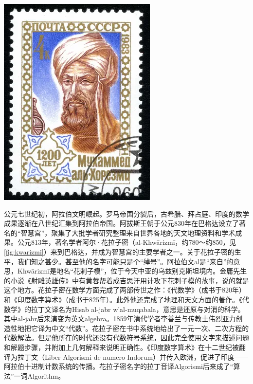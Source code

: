 \documentclass[b5paper]{ctexart}
\begin{document}
\begin{mdframed}

\begin{center}
 \includegraphics[scale=0.3]{img/Khwarizmi}
 \label{fig:kwarizmi}
\end{center}

 \label{sec:Khwarizmi}
公元七世纪初，阿拉伯文明崛起。罗马帝国分裂后，古希腊、拜占庭、印度的数学成果逐渐在八世纪汇集到阿拉伯帝国。阿拔斯王朝于公元830年在巴格达设立了著名的“智慧宫”，聚集了大批学者研究整理来自世界各地的天文地理资料和学术成果。公元813年，著名学者阿尔·花拉子密（al-Khwārizmī，约780～约850，见\cref{fig:kwarizmi}）来到巴格达，并成为智慧宫的主要学者之一。关于花拉子密的生平，我们知之甚少。甚至他的名字可能只是个“绰号”。阿拉伯文al是“来自”的意思，Khwārizmī是地名“花剌子模”，位于今天中亚的乌兹别克斯坦境内。金庸先生的小说《射雕英雄传》中有黄蓉帮着成吉思汗用计攻下花剌子模的故事，说的就是这个地方。花拉子密在数学方面完成了两部传世之作：《代数学》（成书于820年）和《印度数字算术》（成书于825年）。此外他还完成了地理和天文方面的著作。《代数学》的拉丁文译名为Hisab al-jabr w'al-muqabala，意思是还原与对消的科学。其中al-jabr后来演变为英文algebra。1859年清代学者李善兰与传教士伟烈亚力创造性地把它译为中文“代数”\cite{HanXueTao2009}。花拉子密在书中系统地给出了一元一次、二次方程的代数解法。但是他所在的时代还没有代数符号系统，因此完全使用文字来描述问题和解题步骤，并附加上几何解释来说明正确性。《印度数字算术》在十二世纪被翻译为拉丁文（Liber Algorismi de numero Indorum）并传入欧洲，促进了印度——阿拉伯十进制计数系统的传播。花拉子密名字的拉丁音译Algorismi后来成了“算法”一词Algorithm\cite{Britannica-25}。

\end{mdframed}
\end{document}

